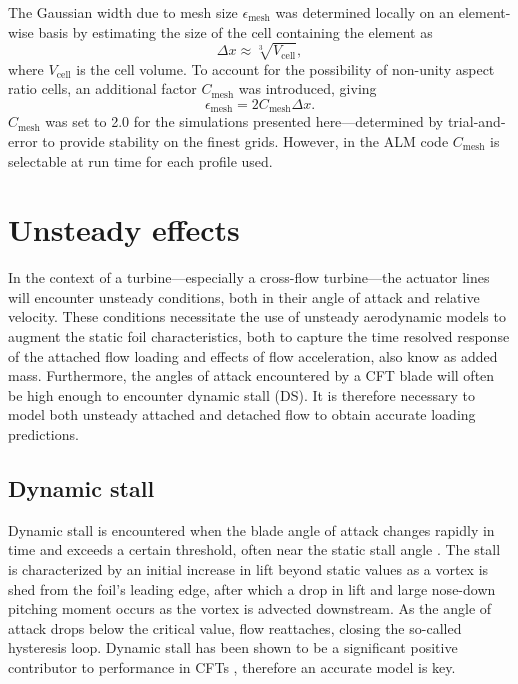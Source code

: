 \documentclass[times]{weauth}
\begin{document}
The Gaussian width due to mesh size $\epsilon_{\mathrm{mesh}}$ was determined
locally on an element-wise basis by estimating the size of the cell containing
the element as
\begin{equation}
    \Delta x \approx \sqrt[3]{V_\mathrm{cell}},
\end{equation}
where $V_\mathrm{cell}$ is the cell volume. To account for the possibility of
non-unity aspect ratio cells, an additional factor $C_\mathrm{mesh}$ was
introduced, giving
\begin{equation}
    \epsilon_{\mathrm{mesh}} = 2C_\mathrm{mesh} \Delta x.
\end{equation}
$C_{\mathrm{mesh}}$ was set to 2.0 for the simulations presented
here---determined by trial-and-error to provide stability on the finest grids.
However, in the ALM code $C_{\mathrm{mesh}}$ is selectable at run time for each
profile used.


\section{Unsteady effects}

In the context of a turbine---especially a cross-flow turbine---the actuator
lines will encounter unsteady conditions, both in their angle of attack and
relative velocity. These conditions necessitate the use of unsteady aerodynamic
models to augment the static foil characteristics, both to capture the time
resolved response of the attached flow loading and effects of flow acceleration,
also know as added mass. Furthermore, the angles of attack encountered by a CFT
blade will often be high enough to encounter dynamic stall (DS). It is therefore
necessary to model both unsteady attached and detached flow to obtain accurate
loading predictions.


\subsection{Dynamic stall}

Dynamic stall is encountered when the blade angle of attack changes rapidly in
time and exceeds a certain threshold, often near the static stall angle
\cite{McCroskey1981}. The stall is characterized by an initial increase in lift
beyond static values as a vortex is shed from the foil's leading edge, after
which a drop in lift and large nose-down pitching moment occurs as the vortex is
advected downstream. As the angle of attack drops below the critical value, flow
reattaches, closing the so-called hysteresis loop. Dynamic stall has been shown
to be a significant positive contributor to performance in CFTs \cite{Para2002,
    Urbina2013}, therefore an accurate model is key.
\end{document}
